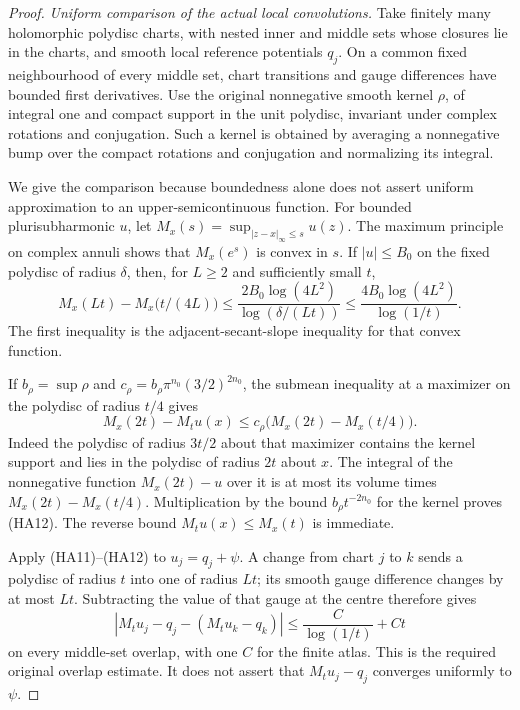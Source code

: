 \begin{proof}
\emph{Uniform comparison of the actual local convolutions.}
Take finitely many holomorphic polydisc charts, with nested inner
and middle sets whose closures lie in the charts, and smooth
local reference potentials $q_j$.  On a common fixed neighbourhood
of every middle set, chart transitions and gauge differences have
bounded first derivatives.  Use the original nonnegative smooth
kernel $\rho$, of integral one and compact support in the unit
polydisc, invariant under complex rotations and conjugation.
Such a kernel is obtained by averaging a nonnegative bump over
the compact rotations and conjugation and normalizing its integral.

We give the comparison because boundedness alone does not assert
uniform approximation to an upper-semicontinuous function.  For
bounded plurisubharmonic $u$, let
$M_x(s)=\sup_{|z-x|_\infty\le s}u(z)$.  The maximum principle
on complex annuli shows that $M_x(e^s)$ is convex in $s$.
If $|u|\le B_0$ on the fixed polydisc of radius $\delta$, then,
for $L\ge2$ and sufficiently small $t$,
\[
 M_x(Lt)-M_x\bigl(t/(4L)\bigr)
 \le\frac{2B_0\log(4L^2)}{\log(\delta/(Lt))}
 \le\frac{4B_0\log(4L^2)}{\log(1/t)}.
 \tag{HA11}
\]
The first inequality is the adjacent-secant-slope inequality for
that convex function.

If $b_\rho=\sup\rho$ and
$c_\rho=b_\rho\pi^{n_0}(3/2)^{2n_0}$, the submean inequality
at a maximizer on the polydisc of radius $t/4$ gives
\[
  M_x(2t)-M_tu(x)
       \le c_\rho\bigl(M_x(2t)-M_x(t/4)\bigr).
 \tag{HA12}
\]
Indeed the polydisc of radius $3t/2$ about that maximizer contains
the kernel support and lies in the polydisc of radius $2t$ about
$x$.  The integral of the nonnegative function $M_x(2t)-u$ over
it is at most its volume times $M_x(2t)-M_x(t/4)$.  Multiplication
by the bound $b_\rho t^{-2n_0}$ for the kernel proves (HA12).
The reverse bound $M_tu(x)\le M_x(t)$ is immediate.

Apply (HA11)--(HA12) to $u_j=q_j+\psi$.  A change from chart
$j$ to $k$ sends a polydisc of radius $t$ into one of radius
$Lt$; its smooth gauge difference changes by at most $Lt$.
Subtracting the value of that gauge at the centre therefore gives
\[
 |M_tu_j-q_j-(M_tu_k-q_k)|
                 \le\frac C{\log(1/t)}+Ct
 \tag{HA13}
\]
on every middle-set overlap, with one $C$ for the finite atlas.
This is the required original overlap estimate.  It does not
assert that $M_tu_j-q_j$ converges uniformly to $\psi$.


\end{proof}
